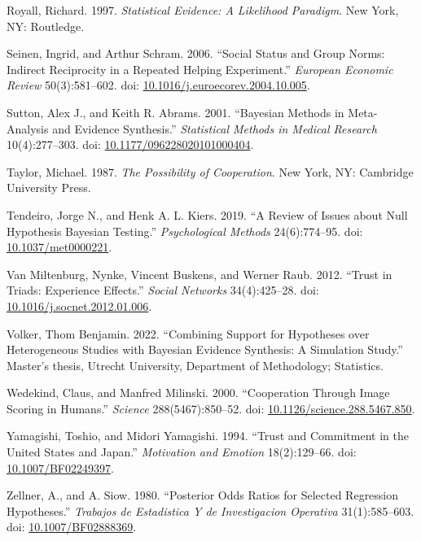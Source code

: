 \documentclass[
  11pt,
]{article}
\newlength{\cslhangindent}
\newlength{\cslentryspacingunit} %
\newenvironment{CSLReferences}[2] %
 {%
  \setlength{\parindent}{0pt}
  \ifodd #1
  \let\oldpar\par
  \def\par{\hangindent=\cslhangindent\oldpar}
  \fi
  \setlength{\parskip}{#2\cslentryspacingunit}
 }%
 {}
\begin{document}
\begin{CSLReferences}{1}{0}
\leavevmode{}%
Royall, Richard. 1997. \emph{{S}tatistical {E}vidence: A {L}ikelihood {P}aradigm}. New York, NY: Routledge.

\leavevmode{}%
Seinen, Ingrid, and Arthur Schram. 2006. {``Social Status and Group Norms: Indirect Reciprocity in a Repeated Helping Experiment.''} \emph{European Economic Review} 50(3):581--602. doi: \href{https://doi.org/10.1016/j.euroecorev.2004.10.005}{10.1016/j.euroecorev.2004.10.005}.

\leavevmode{}%
Sutton, Alex J., and Keith R. Abrams. 2001. {``Bayesian Methods in Meta-Analysis and Evidence Synthesis.''} \emph{Statistical Methods in Medical Research} 10(4):277--303. doi: \href{https://doi.org/10.1177/096228020101000404}{10.1177/096228020101000404}.

\leavevmode{}%
Taylor, Michael. 1987. \emph{The Possibility of Cooperation}. New York, NY: Cambridge University Press.

\leavevmode{}%
Tendeiro, Jorge N., and Henk A. L. Kiers. 2019. {``A Review of Issues about Null Hypothesis Bayesian Testing.''} \emph{Psychological Methods} 24(6):774--95. doi: \href{https://doi.org/10.1037/met0000221}{10.1037/met0000221}.

\leavevmode{}%
Van Miltenburg, Nynke, Vincent Buskens, and Werner Raub. 2012. {``Trust in Triads: Experience Effects.''} \emph{Social Networks} 34(4):425--28. doi: \href{https://doi.org/10.1016/j.socnet.2012.01.006}{10.1016/j.socnet.2012.01.006}.

\leavevmode{}%
Volker, Thom Benjamin. 2022. {``Combining Support for Hypotheses over Heterogeneous Studies with Bayesian Evidence Synthesis: A Simulation Study.''} Master's thesis, Utrecht University, Department of Methodology; Statistics.

\leavevmode{}%
Wedekind, Claus, and Manfred Milinski. 2000. {``Cooperation Through Image Scoring in Humans.''} \emph{Science} 288(5467):850--52. doi: \href{https://doi.org/10.1126/science.288.5467.850}{10.1126/science.288.5467.850}.

\leavevmode{}%
Yamagishi, Toshio, and Midori Yamagishi. 1994. {``Trust and Commitment in the {U}nited {S}tates and {J}apan.''} \emph{Motivation and Emotion} 18(2):129--66. doi: \href{https://doi.org/10.1007/BF02249397}{10.1007/BF02249397}.

\leavevmode{}%
Zellner, A., and A. Siow. 1980. {``Posterior Odds Ratios for Selected Regression Hypotheses.''} \emph{Trabajos de Estadistica Y de Investigacion Operativa} 31(1):585--603. doi: \href{https://doi.org/10.1007/BF02888369}{10.1007/BF02888369}.

\end{CSLReferences}
\end{document}
